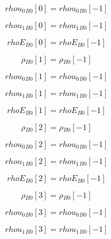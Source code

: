 \documentclass{article}
\begin{document}
\begin{dmath}{rhou_{0}{_{B0}}}[{0}] = {rhou_{0}{_{B0}}}[{-1}]\end{dmath}

\begin{dmath}{rhou_{1}{_{B0}}}[{0}] = {rhou_{1}{_{B0}}}[{-1}]\end{dmath}

\begin{dmath}{rhoE{_{B0}}}[{0}] = {rhoE{_{B0}}}[{-1}]\end{dmath}

\begin{dmath}{\rho{_{B0}}}[{1}] = {\rho{_{B0}}}[{-1}]\end{dmath}

\begin{dmath}{rhou_{0}{_{B0}}}[{1}] = {rhou_{0}{_{B0}}}[{-1}]\end{dmath}

\begin{dmath}{rhou_{1}{_{B0}}}[{1}] = {rhou_{1}{_{B0}}}[{-1}]\end{dmath}

\begin{dmath}{rhoE{_{B0}}}[{1}] = {rhoE{_{B0}}}[{-1}]\end{dmath}

\begin{dmath}{\rho{_{B0}}}[{2}] = {\rho{_{B0}}}[{-1}]\end{dmath}

\begin{dmath}{rhou_{0}{_{B0}}}[{2}] = {rhou_{0}{_{B0}}}[{-1}]\end{dmath}

\begin{dmath}{rhou_{1}{_{B0}}}[{2}] = {rhou_{1}{_{B0}}}[{-1}]\end{dmath}

\begin{dmath}{rhoE{_{B0}}}[{2}] = {rhoE{_{B0}}}[{-1}]\end{dmath}

\begin{dmath}{\rho{_{B0}}}[{3}] = {\rho{_{B0}}}[{-1}]\end{dmath}

\begin{dmath}{rhou_{0}{_{B0}}}[{3}] = {rhou_{0}{_{B0}}}[{-1}]\end{dmath}

\begin{dmath}{rhou_{1}{_{B0}}}[{3}] = {rhou_{1}{_{B0}}}[{-1}]\end{dmath}
\end{document}
